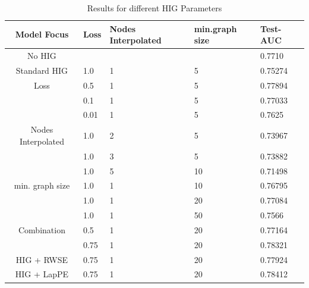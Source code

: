 \begin{table}[ht!]
    \centering
    \caption{Results for different HIG Parameters}
    \label{node_features}
    \begin{tabular}{c || l|l|l| p{6cm} |}
        Model Focus            & Loss & Nodes Interpolated & min.graph size & Test-AUC \\
        \hline
        \hline
        No HIG    &     &    &               &  0.7710  \\
        \hline
        Standard HIG      &  1.0& 1& 5            & 0.75274  \\
        \hline
        Loss               & 0.5& 1& 5                    & 0.77894  \\
                           & 0.1& 1& 5                    & 0.77033  \\
                           & 0.01& 1& 5                   & 0.7625   \\
        \hline
        Nodes Interpolated & 1.0& 2& 5                      & 0.73967  \\
                 & 1.0& 3& 5                      & 0.73882  \\
                                   & 1.0& 5& 10                      & 0.71498  \\
        \hline
        min. graph size    & 1.0& 1& 10                & 0.76795  \\
                 & 1.0& 1& 20                & 0.77084  \\
                           & 1.0& 1& 50                & 0.7566   \\
        \hline
        Combination   & 0.5& 1& 20                & 0.77164  \\
            & 0.75& 1& 20                & 0.78321  \\
        \hline
        HIG + RWSE   & 0.75& 1& 20                & 0.77924  \\
        \hline
        HIG + LapPE   & 0.75& 1& 20                & 0.78412  \\
    \end{tabular}
\end{table}

